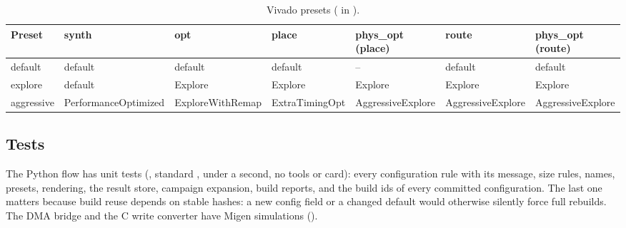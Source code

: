 \begin{table}[ht]
\centering\scriptsize\setlength{\tabcolsep}{4pt}
\caption{Vivado presets ( in ).}
\label{tab:presets}
\begin{tabular}{@{}lllllll@{}}
\toprule
Preset & synth & opt & place & phys\_opt (place) & route & phys\_opt (route) \\
\midrule
default & default & default & default & -- & default & default \\
explore & default & Explore & Explore & Explore & Explore & Explore \\
aggressive & PerformanceOptimized & ExploreWithRemap & ExtraTimingOpt & AggressiveExplore & AggressiveExplore & AggressiveExplore \\
\bottomrule
\end{tabular}
\end{table}

\subsection{Tests}
The Python flow has unit tests (, standard , under a second, no tools or card): every
configuration rule with its message, size rules, names, presets,  rendering, the result store, campaign
expansion, build reports, and the build ids of every committed configuration. The last one matters because build reuse
depends on stable hashes: a new config field or a changed default would otherwise silently force full rebuilds. The
DMA bridge and the C write converter have Migen simulations ().
